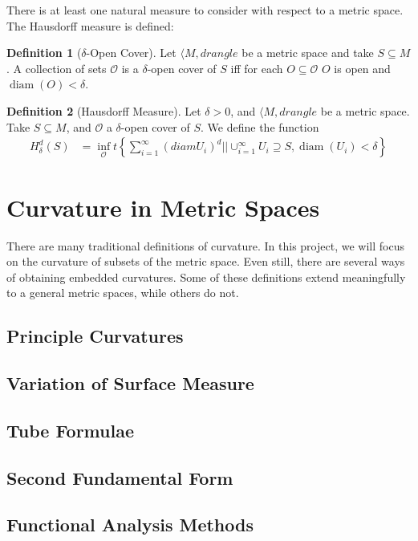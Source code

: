 \documentclass{article}
\theoremstyle{definition}
\theoremstyle{definition}
\newtheorem*{defn}{Definition}
\theoremstyle{plain}
\renewcommand{\(}{\left(}
\renewcommand{\)}{\right)}
\newcommand{\superseteq}{\supseteq}
\DeclareMathOperator{\diam}{diam}
\begin{document}
There is at least one natural measure to consider with respect to a metric space.  The Hausdorff measure is defined:
\begin{defn}[$\delta$-Open Cover] \label{def:delta-open-covar}
  Let $\langle M, d rangle$ be a metric space and take $S \subseteq M$. A collection of sets $\mathcal O$ is a $\delta$-open cover of $S$ iff for each $O \subseteq \mathcal O$ $O$ is open and $\diam(O) < \delta$.
\end{defn}
\begin{defn}[Hausdorff Measure] \label{def:hausdorff-measure}
  Let $\delta > 0$, and $\langle M, d rangle$ be a metric space.
  Take $S \subseteq M$, and $\mathcal O$ a $\delta$-open cover of $S$.
  We define the function
  \begin{align*}
    H_\delta^d(S) &= \inf_{\mathcal O} t \left\{ \sum_{i=1}^\infty (diam U_i)^d \mid\vert \cup_{i=1}^\infty U_i \superseteq S, \diam{(U_i)} < \delta \right\}
  \end{align*}
\end{defn}


\section{Curvature in Metric Spaces}
There are many traditional definitions of curvature.  In this project, we will focus on the curvature of subsets of the metric space.  Even still, there are several ways of obtaining embedded curvatures.  Some of these definitions extend meaningfully to a general metric spaces, while others do not.

\subsection{Principle Curvatures}
\subsection{Variation of Surface Measure}
\subsection{Tube Formulae}
\subsection{Second Fundamental Form}
\subsection{Functional Analysis Methods}
\end{document}
